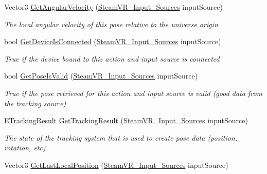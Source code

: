 \begin{DoxyCompactItemize}
Vector3 \mbox{\hyperlink{class_valve_1_1_v_r_1_1_steam_v_r___action___pose___base_a9e11dfd61cb934d7562f7ead82bd3977}{Get\+Angular\+Velocity}} (\mbox{\hyperlink{namespace_valve_1_1_v_r_a82e5bf501cc3aa155444ee3f0662853f}{Steam\+V\+R\+\_\+\+Input\+\_\+\+Sources}} input\+Source)
\begin{DoxyCompactList}\small\item\em The local angular velocity of this pose relative to the universe origin \end{DoxyCompactList}\item 
bool \mbox{\hyperlink{class_valve_1_1_v_r_1_1_steam_v_r___action___pose___base_a9a48969933cf18a41139748fc3fa1c58}{Get\+Device\+Is\+Connected}} (\mbox{\hyperlink{namespace_valve_1_1_v_r_a82e5bf501cc3aa155444ee3f0662853f}{Steam\+V\+R\+\_\+\+Input\+\_\+\+Sources}} input\+Source)
\begin{DoxyCompactList}\small\item\em True if the device bound to this action and input source is connected \end{DoxyCompactList}\item 
bool \mbox{\hyperlink{class_valve_1_1_v_r_1_1_steam_v_r___action___pose___base_ae83ce8dae5f87c106ccbd0860c8f1181}{Get\+Pose\+Is\+Valid}} (\mbox{\hyperlink{namespace_valve_1_1_v_r_a82e5bf501cc3aa155444ee3f0662853f}{Steam\+V\+R\+\_\+\+Input\+\_\+\+Sources}} input\+Source)
\begin{DoxyCompactList}\small\item\em True if the pose retrieved for this action and input source is valid (good data from the tracking source) \end{DoxyCompactList}\item 
\mbox{\hyperlink{namespace_valve_1_1_v_r_abe6feab98f33191b7c27b4292012e90a}{E\+Tracking\+Result}} \mbox{\hyperlink{class_valve_1_1_v_r_1_1_steam_v_r___action___pose___base_ac4aa642c201073f77df62ff087351ca2}{Get\+Tracking\+Result}} (\mbox{\hyperlink{namespace_valve_1_1_v_r_a82e5bf501cc3aa155444ee3f0662853f}{Steam\+V\+R\+\_\+\+Input\+\_\+\+Sources}} input\+Source)
\begin{DoxyCompactList}\small\item\em The state of the tracking system that is used to create pose data (position, rotation, etc) \end{DoxyCompactList}\item 
Vector3 \mbox{\hyperlink{class_valve_1_1_v_r_1_1_steam_v_r___action___pose___base_ab2e7b7757252e937fb6c007f36da7f57}{Get\+Last\+Local\+Position}} (\mbox{\hyperlink{namespace_valve_1_1_v_r_a82e5bf501cc3aa155444ee3f0662853f}{Steam\+V\+R\+\_\+\+Input\+\_\+\+Sources}} input\+Source)

\end{DoxyCompactItemize}
